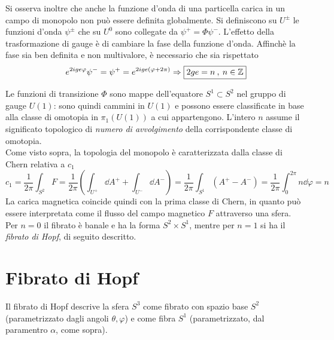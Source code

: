 Si osserva inoltre che anche la funzione d'onda di una particella carica in un
campo di monopolo non può essere definita globalmente.
Si definiscono su $U^\pm$ le funzioni d'onda $\psi^\pm$ che su $U^0$ sono collegate
da $\psi^+ = \Phi  \psi^-$. L'effetto della trasformazione di gauge è di cambiare la fase
della funzione d'onda. Affinchè la fase sia ben definita e non multivalore, è necessario
che sia rispettato
$$
   e^{2ige \varphi} \psi ^- = \psi ^+ =  e^{2ige (\varphi + 2\pi)}
   \Rightarrow
   \boxed{
   2ge = n \:,\: n \in \mathbb{Z}
   }
$$

Le funzioni di transizione $\Phi$ sono mappe dell'equatore $S^1 \subset S^2$ nel gruppo
di gauge $U(1)$: sono quindi cammini in $U(1)$ e possono essere
classificate in base alla classe di omotopia in $\pi_1(U(1))$ a cui appartengono.
L'intero $n$ assume il significato topologico di \emph{numero di avvolgimento}
della corrispondente classe di omotopia.\\

Come visto sopra, la topologia del monopolo è caratterizzata dalla classe di Chern
relativa a $c_1$
\begin{equation*}
      c_1   = \frac{1}{2\pi} \int_{S^2} F
            = \frac{1}{2\pi} \left( \int_{U^+} \dd A^+ + \int_{U^-} \dd A^- \right)
            = \frac{1}{2\pi} \int_{S^1} (A^+-A^-)
            = \frac{1}{2\pi} \int_0^{2\pi} n\dd \varphi   = n
\end{equation*}
La carica magnetica coincide quindi con la prima classe di Chern, in quanto
può essere interpretata come il flusso del campo magnetico $F$ attraverso una sfera.\\
Per $n=0$ il fibrato è banale e ha la forma $S^2 \times S^1$, mentre per $n=1$ si ha il
\emph{fibrato di Hopf}, di seguito descritto.

\section{Fibrato di Hopf}
Il fibrato di Hopf descrive la sfera $S^3$ come fibrato con spazio
base $S^2$ (parametrizzato dagli angoli $\theta,\varphi $) e come fibra $S^1$ (parametrizzato,
dal paramentro $\alpha$, come sopra).\\

